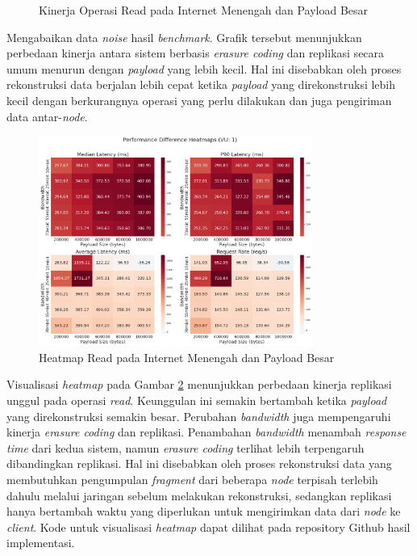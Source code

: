 \begin{enumerate}
\begin{figure}[ht]
    \caption{Kinerja Operasi Read pada Internet Menengah dan Payload Besar}
    \label{fig:read-bigload-avgnet}
  \end{figure}

  Mengabaikan data \textit{noise} hasil \textit{benchmark}. Grafik tersebut menunjukkan perbedaan kinerja antara sistem berbasis \textit{erasure coding} dan replikasi secara umum menurun dengan \textit{payload} yang lebih kecil. Hal ini disebabkan oleh proses rekonstruksi data berjalan lebih cepat ketika \textit{payload} yang direkonstruksi lebih kecil dengan berkurangnya operasi yang perlu dilakukan dan juga pengiriman data antar-\textit{node}.

  \begin{figure}[ht]
    \centering
    \includegraphics[width=0.8\textwidth]{resources/chapter-4/read_bigload_avgnet_heatmap.png}

    \caption{Heatmap Read pada Internet Menengah dan Payload Besar}
    \label{fig:read-bigload-avgnet-heatmap}
  \end{figure}

  Visualisasi \textit{heatmap} pada Gambar \ref{fig:read-bigload-avgnet-heatmap} menunjukkan perbedaan kinerja replikasi unggul pada operasi \textit{read}. Keunggulan ini semakin bertambah ketika \textit{payload} yang direkonstruksi semakin besar. Perubahan \textit{bandwidth} juga mempengaruhi kinerja \textit{erasure coding} dan replikasi. Penambahan \textit{bandwidth} menambah \textit{response time} dari kedua sistem, namun \textit{erasure coding} terlihat lebih terpengaruh dibandingkan replikasi. Hal ini disebabkan oleh proses rekonstruksi data yang membutuhkan pengumpulan \textit{fragment} dari beberapa \textit{node} terpisah terlebih dahulu melalui jaringan sebelum melakukan rekonstruksi, sedangkan replikasi hanya bertambah waktu yang diperlukan untuk mengirimkan data dari \textit{node} ke \textit{client}. Kode untuk visualisasi \textit{heatmap} dapat dilihat pada repository Github hasil implementasi.


\end{enumerate}
